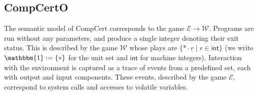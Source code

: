 \documentclass[acmsmall,authordraft]{acmart}
\newcommand{\kw}[1]{\ensuremath{ \mathsf{#1} }}
\begin{document}
%
%
%
%
%

\subsection{CompCertO} \label{sec:mainideas:compcerto} %

The semantic model of CompCert corresponds to
the game $\mathcal{E} \rightarrow \mathcal{W}$.
Programs are run without any parameters,
and produce a single integer denoting their exit status.
This is described by the game $\mathcal{W}$
whose plays are $\{ * \cdot \underline{r} \mid r \in \kw{int} \}$
(we write $\mathbbm{1} := \{ * \}$ for the unit set
and $\kw{int}$ for machine integers).
Interaction with the environment
is captured as a trace of events from a predefined set,
each with output and input components.
These events,
described by the game $\mathcal{E}$,
correspond to system calls and accesses to volatile variables.
\end{document}
